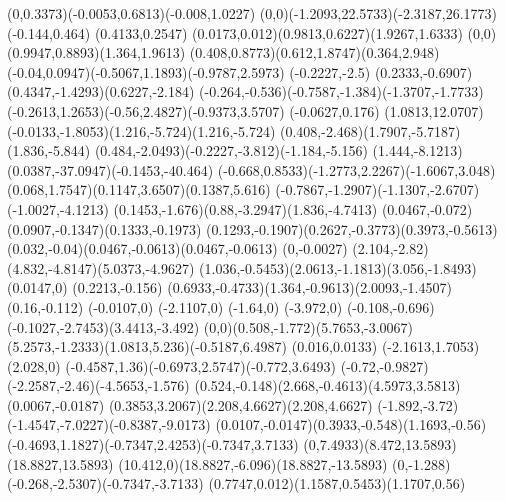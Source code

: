 {    \rcurveto(0,0.3373)(-0.0053,0.6813)(-0.008,1.0227)
    \rcurveto(0,0)(-1.2093,22.5733)(-2.3187,26.1773)
    \rlineto(-0.144,0.464)
    \rlineto(0.4133,0.2547)
    \rcurveto(0.0173,0.012)(0.9813,0.6227)(1.9267,1.6333)
    \rcurveto(0,0)(0.9947,0.8893)(1.364,1.9613)
    \rcurveto(0.408,0.8773)(0.612,1.8747)(0.364,2.948)
    \rcurveto(-0.04,0.0947)(-0.5067,1.1893)(-0.9787,2.5973)
    \rlineto(-0.2227,-2.5)
    \rcurveto(0.2333,-0.6907)(0.4347,-1.4293)(0.6227,-2.184)
    \rcurveto(-0.264,-0.536)(-0.7587,-1.384)(-1.3707,-1.7733)
    \rcurveto(-0.2613,1.2653)(-0.56,2.4827)(-0.9373,3.5707)
    \rlineto(-0.0627,0.176)
    \rlineto(1.0813,12.0707)
    \rcurveto(-0.0133,-1.8053)(1.216,-5.724)(1.216,-5.724)
    \rcurveto(0.408,-2.468)(1.7907,-5.7187)(1.836,-5.844)
    \rcurveto(0.484,-2.0493)(-0.2227,-3.812)(-1.184,-5.156)
    \rcurveto(1.444,-8.1213)(0.0387,-37.0947)(-0.1453,-40.464)
    \rcurveto(-0.668,0.8533)(-1.2773,2.2267)(-1.6067,3.048)
    \rcurveto(0.068,1.7547)(0.1147,3.6507)(0.1387,5.616)
    \rcurveto(-0.7867,-1.2907)(-1.1307,-2.6707)(-1.0027,-4.1213)
    \rcurveto(0.1453,-1.676)(0.88,-3.2947)(1.836,-4.7413)
    \rcurveto(0.0467,-0.072)(0.0907,-0.1347)(0.1333,-0.1973)
    \rcurveto(0.1293,-0.1907)(0.2627,-0.3773)(0.3973,-0.5613)
    \rcurveto(0.032,-0.04)(0.0467,-0.0613)(0.0467,-0.0613)
    \rlineto(0,-0.0027)
    \rcurveto(2.104,-2.82)(4.832,-4.8147)(5.0373,-4.9627)
    \rcurveto(1.036,-0.5453)(2.0613,-1.1813)(3.056,-1.8493)
    \rlineto(0.0147,0)
    \rlineto(0.2213,-0.156)
    \rcurveto(0.6933,-0.4733)(1.364,-0.9613)(2.0093,-1.4507)
    \rlineto(0.16,-0.112)
    \rlineto(-0.0107,0)
    \rlineto(-2.1107,0)
    \rlineto(-1.64,0)
    \rlineto(-3.972,0)
    \rcurveto(-0.108,-0.696)(-0.1027,-2.7453)(3.4413,-3.492)
    \rcurveto(0,0)(0.508,-1.772)(5.7653,-3.0067)
    \rcurveto(5.2573,-1.2333)(1.0813,5.236)(-0.5187,6.4987)
    \rlineto(0.016,0.0133)
    \rlineto(-2.1613,1.7053)
    \rlineto(2.028,0)
    \rcurveto(-0.4587,1.36)(-0.6973,2.5747)(-0.772,3.6493)
    \rcurveto(-0.72,-0.9827)(-2.2587,-2.46)(-4.5653,-1.576)
    \rcurveto(0.524,-0.148)(2.668,-0.4613)(4.5973,3.5813)
    \rlineto(0.0067,-0.0187)
    \rcurveto(0.3853,3.2067)(2.208,4.6627)(2.208,4.6627)
    \rcurveto(-1.892,-3.72)(-1.4547,-7.0227)(-0.8387,-9.0173)
    \rcurveto(0.0107,-0.0147)(0.3933,-0.548)(1.1693,-0.56)
    \rcurveto(-0.4693,1.1827)(-0.7347,2.4253)(-0.7347,3.7133)
    \rcurveto(0,7.4933)(8.472,13.5893)(18.8827,13.5893)
    \rcurveto(10.412,0)(18.8827,-6.096)(18.8827,-13.5893)
    \rcurveto(0,-1.288)(-0.268,-2.5307)(-0.7347,-3.7133)
    \rcurveto(0.7747,0.012)(1.1587,0.5453)(1.1707,0.56)
}
